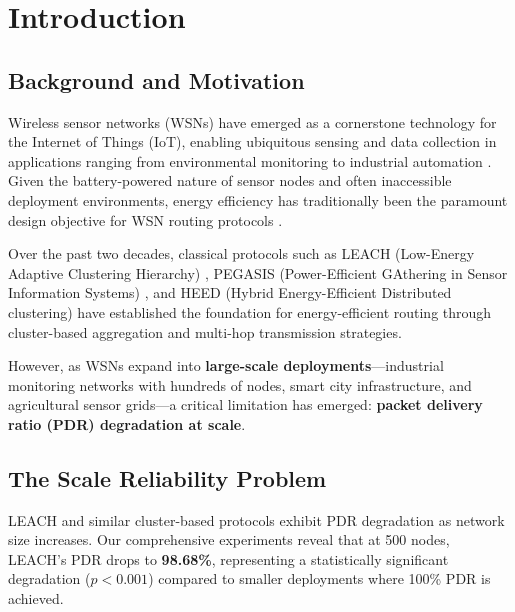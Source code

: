 
\section{Introduction}
\label{sec:introduction}

\subsection{Background and Motivation}

Wireless sensor networks (WSNs) have emerged as a cornerstone technology for
the Internet of Things (IoT), enabling ubiquitous sensing and data collection
in applications ranging from environmental monitoring to industrial automation
\cite{akyildiz2002wsn, yick2008wsn}. Given the battery-powered nature
of sensor nodes and often inaccessible deployment environments, energy
efficiency has traditionally been the paramount design objective for WSN
routing protocols \cite{heinzelman2000leach, lindsey2002pegasis}.

Over the past two decades, classical protocols such as LEACH (Low-Energy
Adaptive Clustering Hierarchy) \cite{heinzelman2000leach}, PEGASIS
(Power-Efficient GAthering in Sensor Information Systems) \cite{lindsey2002pegasis},
and HEED (Hybrid Energy-Efficient Distributed clustering) \cite{younis2004heed}
have established the foundation for energy-efficient routing through
cluster-based aggregation and multi-hop transmission strategies.

However, as WSNs expand into \textbf{large-scale deployments}---industrial
monitoring networks with hundreds of nodes, smart city infrastructure, and
agricultural sensor grids---a critical limitation has emerged:
\textbf{packet delivery ratio (PDR) degradation at scale}.

\subsection{The Scale Reliability Problem}

LEACH and similar cluster-based protocols exhibit PDR degradation as network
size increases. Our comprehensive experiments reveal that at 500 nodes, LEACH's
PDR drops to \textbf{98.68\%}, representing a statistically significant
degradation ($p<0.001$) compared to smaller deployments where 100\% PDR is
achieved.


